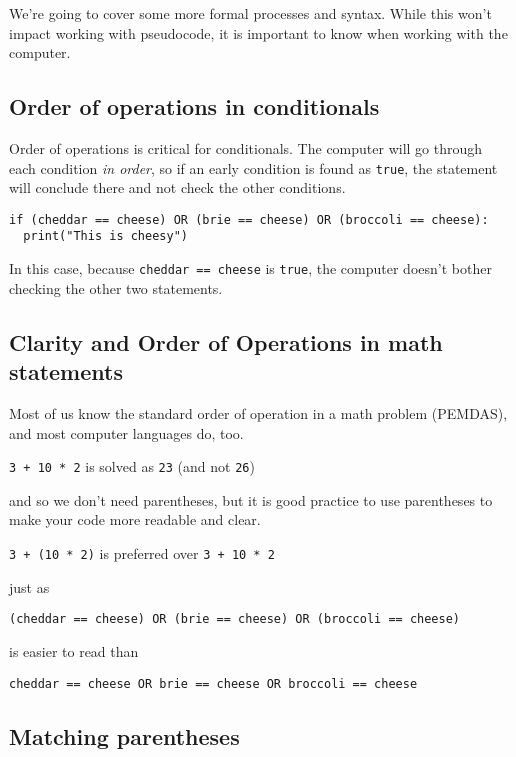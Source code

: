 \documentclass[
]{book}
\begin{document}
We're going to cover some more formal processes and syntax. While this won't impact working with pseudocode, it is important to know when working with the computer.

\subsection{Order of operations in conditionals}\label{order-of-operations-in-conditionals}

Order of operations is critical for conditionals. The computer will go through each condition \emph{in order}, so if an early condition is found as \texttt{true}, the statement will conclude there and not check the other conditions.

\begin{verbatim}
if (cheddar == cheese) OR (brie == cheese) OR (broccoli == cheese):
  print("This is cheesy")
\end{verbatim}

In this case, because \texttt{cheddar\ ==\ cheese} is \texttt{true}, the computer doesn't bother checking the other two statements.

\subsection{Clarity and Order of Operations in math statements}\label{clarity-and-order-of-operations-in-math-statements}

Most of us know the standard order of operation in a math problem (PEMDAS), and most computer languages do, too.

\texttt{3\ +\ 10\ *\ 2} is solved as \texttt{23} (and not \texttt{26})

and so we don't need parentheses, but it is good practice to use parentheses to make your code more readable and clear.

\texttt{3\ +\ (10\ *\ 2)} is preferred over \texttt{3\ +\ 10\ *\ 2}

just as

\texttt{(cheddar\ ==\ cheese)\ OR\ (brie\ ==\ cheese)\ OR\ (broccoli\ ==\ cheese)}

is easier to read than

\texttt{cheddar\ ==\ cheese\ OR\ brie\ ==\ cheese\ OR\ broccoli\ ==\ cheese}

\subsection{Matching parentheses}\label{matching-parentheses}
\end{document}

